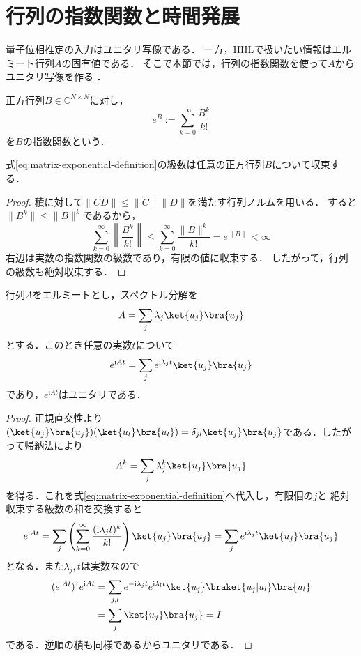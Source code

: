 \section{行列の指数関数と時間発展}
\label{sec:matrix-exponential}

量子位相推定の入力はユニタリ写像である．
一方，HHLで扱いたい情報はエルミート行列$A$の固有値である．
そこで本節では，行列の指数関数を使って$A$からユニタリ写像を作る
\cite{shimada2020}．

\begin{defi}[行列指数関数]
正方行列$B\in\mathbb C^{N\times N}$に対し，
\begin{equation}
 e^B:=\sum_{k=0}^{\infty}\frac{B^k}{k!}
 \label{eq:matrix-exponential-definition}
\end{equation}
を$B$の指数関数という．
\end{defi}

\begin{prop}
式\eqref{eq:matrix-exponential-definition}の級数は任意の正方行列$B$について収束する．
\end{prop}
\begin{proof}
積に対して$\lVert CD\rVert\leq\lVert C\rVert\lVert D\rVert$を満たす行列ノルムを用いる．
すると$\lVert B^k\rVert\leq\lVert B\rVert^k$であるから，
\[
 \sum_{k=0}^{\infty}\left\lVert\frac{B^k}{k!}\right\rVert
 \leq\sum_{k=0}^{\infty}\frac{\lVert B\rVert^k}{k!}
 =e^{\lVert B\rVert}<\infty
\]
右辺は実数の指数関数の級数であり，有限の値に収束する．
したがって，行列の級数も絶対収束する．
\end{proof}

\begin{theo}
行列$A$をエルミートとし，スペクトル分解を
\begin{equation}
 A=\sum_j\lambda_j\ket{u_j}\bra{u_j}
 \label{eq:hermitian-spectral-decomposition}
\end{equation}
とする．このとき任意の実数$t$について
\begin{equation}
 e^{\mathrm{i}At}
 =\sum_j e^{\mathrm{i}\lambda_jt}\ket{u_j}\bra{u_j}
 \label{eq:matrix-exponential-spectral}
\end{equation}
であり，$e^{\mathrm{i}At}$はユニタリである．
\end{theo}
\begin{proof}
正規直交性より
$(\ket{u_j}\bra{u_j})(\ket{u_l}\bra{u_l})
=\delta_{jl}\ket{u_j}\bra{u_j}$である．したがって帰納法により
\[
 A^k=\sum_j\lambda_j^k\ket{u_j}\bra{u_j}
\]
を得る．これを式\eqref{eq:matrix-exponential-definition}へ代入し，有限個の$j$と
絶対収束する級数の和を交換すると
\[
 e^{\mathrm{i}At}
 =\sum_j\left(\sum_{k=0}^{\infty}
   \frac{(\mathrm{i}\lambda_jt)^k}{k!}\right)
   \ket{u_j}\bra{u_j}
 =\sum_je^{\mathrm{i}\lambda_jt}\ket{u_j}\bra{u_j}
\]
となる．また$\lambda_j,t$は実数なので
\begin{align*}
 (e^{\mathrm{i}At})^\dagger e^{\mathrm{i}At}
 &=\sum_{j,l}e^{-\mathrm{i}\lambda_jt}e^{\mathrm{i}\lambda_lt}
   \ket{u_j}\braket{u_j|u_l}\bra{u_l}\\
 &=\sum_j\ket{u_j}\bra{u_j}=I
\end{align*}
である．逆順の積も同様であるからユニタリである．
\end{proof}

